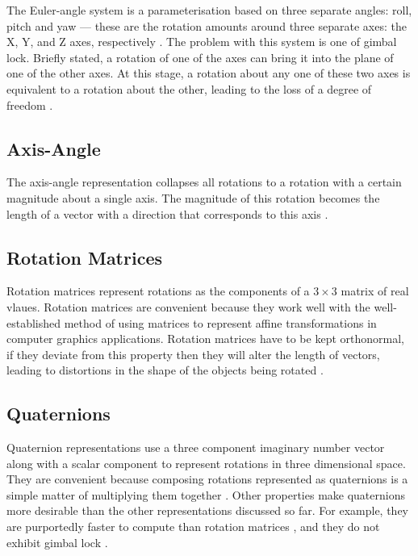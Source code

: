\documentclass{acm_proc_article-sp}
\begin{document}
The Euler-angle system is a parameterisation based on three separate angles: roll, pitch and yaw --- these are the rotation amounts around three separate axes: the X, Y, and Z axes, respectively \cite{diebel06}.
The problem with this system is one of gimbal lock.
Briefly stated, a rotation of one of the axes can bring it into the plane of one of the other axes.
At this stage, a rotation about any one of these two axes is equivalent to a rotation about the other, leading to the loss of a degree of freedom \cite{pletinckx89}.

\subsection{Axis-Angle}

The axis-angle representation collapses all rotations to a rotation with a certain magnitude about a single axis.
The magnitude of this rotation becomes the length of a vector with a direction that corresponds to this axis \cite{diebel06}.

\subsection{Rotation Matrices}

Rotation matrices represent rotations as the components of a $3 \times 3$ matrix of real vlaues.
Rotation matrices are convenient because they work well with the well-established method of using matrices to represent affine transformations in computer graphics applications.
Rotation matrices have to be kept orthonormal, if they deviate from this property then they will alter the length of vectors, leading to distortions in the shape of the objects being rotated \cite{diebel06}.

\subsection{Quaternions}

Quaternion representations use a three component imaginary number vector along with a scalar component to represent rotations in three dimensional space.
They are convenient because composing rotations represented as quaternions is a simple matter of multiplying them together \cite{schoemake85}.
Other properties make quaternions more desirable than the other representations discussed so far.
For example, they are purportedly faster to compute than rotation matrices \cite{taylor79}, and they do not exhibit gimbal lock \cite{schoemake85}.
\end{document}
